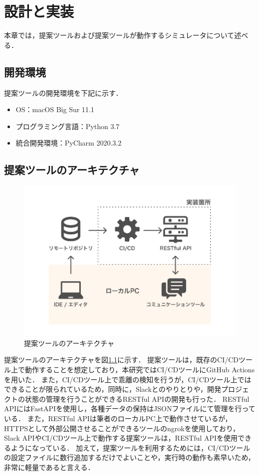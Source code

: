 \chapter{設計と実装}
本章では，提案ツールおよび提案ツールが動作するシミュレータについて述べる．

\section{開発環境}
提案ツールの開発環境を下記に示す．

\begin{itemize}
    \item OS：macOS Big Sur 11.1
    \item プログラミング言語：Python 3.7
    \item 統合開発環境：PyCharm 2020.3.2
\end{itemize}

\section{提案ツールのアーキテクチャ}
\label{toolartchitecture}

\begin{figure}[H]
    \centering
    \includegraphics[width=12cm]{images/architecture.png}
    \caption{提案ツールのアーキテクチャ}
    \label{architecture}
\end{figure}

提案ツールのアーキテクチャを図\ref{architecture}に示す．
提案ツールは，既存のCI/CDツール上で動作することを想定しており，本研究ではCI/CDツールにGitHub Actions\cite{actions}を用いた．
また，CI/CDツール上で乖離の検知を行うが，CI/CDツール上ではできることが限られているため，同時に，Slackとのやりとりや，開発プロジェクトの状態の管理を行うことができるRESTful APIの開発も行った．
RESTful APIにはFastAPIを使用し，各種データの保持はJSONファイルにて管理を行っている．
また，RESTful APIは筆者のローカルPC上で動作させているが，HTTPSとして外部公開させることができるツールのngrok\cite{ngrok}を使用しており，
Slack APIやCI/CDツール上で動作する提案ツールは，RESTful APIを使用できるようになっている．
加えて，提案ツールを利用するためには，CI/CDツールの設定ファイルに数行追加するだけでよいことや，実行時の動作も素早いため，非常に軽量であると言える．

